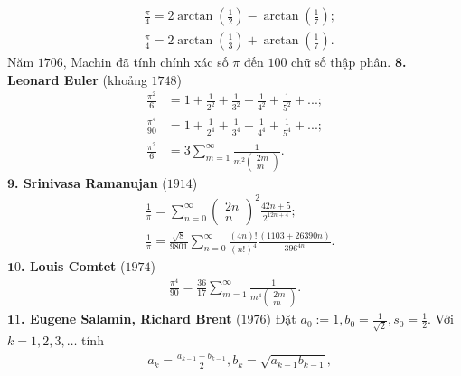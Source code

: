 \begin{multicols}{2}
\begin{align*}
		&\frac{\pi }{4} = 2\arctan \left( {\frac{1}{2}} \right) - \arctan \left( {\frac{1}{7}} \right);\\
		&\frac{\pi }{4} = 2\arctan \left( {\frac{1}{3}} \right) + \arctan \left( {\frac{1}{7}} \right).
	\end{align*}
	Năm $1706$, Machin đã tính chính xác số $\pi$  đến $100$ chữ số thập phân.
	\vskip 0.1cm
	$\pmb8$\textbf{\color{lichsutoanhoc}. Leonard Euler} (khoảng $1748$)
	\begin{align*}
		\frac{{{\pi ^2}}}{6} &= 1 + \frac{1}{{{2^2}}} + \frac{1}{{{3^2}}} + \frac{1}{{{4^2}}} + \frac{1}{{{5^2}}} + ...;\\
		\frac{{{\pi ^4}}}{{90}} &= 1 + \frac{1}{{{2^4}}} + \frac{1}{{{3^4}}} + \frac{1}{{{4^4}}} + \frac{1}{{{5^4}}} + ...;\\
		\frac{{{\pi ^2}}}{6} &= 3\sum\limits_{m = 1}^\infty  {\frac{1}{{{m^2}\left( \begin{array}{l}
						2m\\
						m
					\end{array} \right)}}} .
	\end{align*}
	$\pmb9$\textbf{\color{lichsutoanhoc}. Srinivasa Ramanujan} ($1914$)
	\begin{align*}
		&\frac{1}{\pi } = {\sum\limits_{n = 0}^\infty  {\left( \begin{array}{l}
					2n\\
					n
				\end{array} \right)} ^2}\frac{{42n + 5}}{{{2^{12n + 4}}}};\\
		&\frac{1}{\pi } = \frac{{\sqrt 8 }}{{9801}}\sum\limits_{n = 0}^\infty  {\frac{{\left( {4n} \right)!}}{{{{\left( {n!} \right)}^4}}}} \frac{{\left( {1103 + 26390n} \right)}}{{{{396}^{4n}}}}.
	\end{align*}
	$\pmb10$\textbf{\color{lichsutoanhoc}. Louis Comtet} ($1974$)
	\begin{align*}
		\frac{{{\pi ^4}}}{{90}} = \frac{{36}}{{17}}\sum\limits_{m = 1}^\infty  {\frac{1}{{{m^4}\left( \begin{array}{l}
						2m\\
						m
					\end{array} \right)}}.} 
	\end{align*}
	$\pmb11$\textbf{\color{lichsutoanhoc}. Eugene Salamin, Richard Brent} ($1976$)
	\vskip 0.1cm
	Đặt $a_0 := 1, b_0 = \frac{1}{\sqrt{2}}, s_0 = \frac{1}{2}$.
	\vskip 0.1cm     
	Với $k = 1,2,3, \ldots$ tính 
	\begin{align*}
		&{a_k} = \frac{{{a_{k - 1}} + {b_{k - 1}}}}{2}, {b_k} = \sqrt {{a_{k - 1}}{b_{k - 1}}} ,\\

\end{align*}
\end{multicols}
